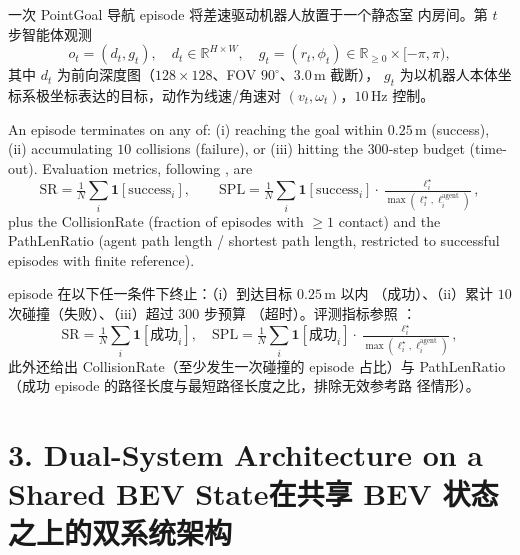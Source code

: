 \documentclass[11pt,a4paper]{article}
\providecommand{\citet}[1]{\cite{#1}}
\newcommand{\en}[1]{\par\noindent #1\par\vspace{0.15em}}
\newcommand{\zh}[1]{\par\noindent\color{zhcol}\hspace{0.5em}#1\par\color{black}\vspace{0.6em}}
\newcommand{\bisec}[2]{\section[#1]{#1\quad\normalfont\small\color{zhcol}\textsf{#2}}}
\newcommand{\R}{\mathbb{R}}
\begin{document}
\zh{\textsf{一次 PointGoal 导航 episode 将差速驱动机器人放置于一个静态室
内房间。第 $t$ 步智能体观测
\[
  o_t = (d_t, g_t),\quad
  d_t \in \R^{H\times W},\quad
  g_t = (r_t, \phi_t) \in \R_{\ge 0}\times[-\pi,\pi),
\]
其中 $d_t$ 为前向深度图（$128\times128$、FOV $90^\circ$、$3.0\,$m 截断），
$g_t$ 为以机器人本体坐标系极坐标表达的目标，动作为线速/角速对
$(v_t, \omega_t)$，$10\,$Hz 控制。}}

\en{An episode terminates on any of: (i) reaching the goal within
$0.25\,$m (success), (ii) accumulating $10$ collisions (failure), or
(iii) hitting the $300$-step budget (time-out). Evaluation metrics,
following \citet{AndersonOnEvaluation2018}, are
\[
  \mathrm{SR} = \tfrac{1}{N}\sum_{i} \mathbf{1}[\text{success}_i],
  \qquad
  \mathrm{SPL} = \tfrac{1}{N}\sum_{i} \mathbf{1}[\text{success}_i]\cdot
                 \tfrac{\ell^{\star}_i}{\max(\ell^{\star}_i,\ell^{\text{agent}}_i)},
\]
plus the CollisionRate (fraction of episodes with $\ge 1$ contact) and the
PathLenRatio (agent path length / shortest path length, restricted to
successful episodes with finite reference).}

\zh{\textsf{episode 在以下任一条件下终止：（i）到达目标 $0.25\,$m 以内
（成功）、（ii）累计 $10$ 次碰撞（失败）、（iii）超过 $300$ 步预算
（超时）。评测指标参照 \citet{AndersonOnEvaluation2018}：
\[
  \mathrm{SR} = \tfrac{1}{N}\sum_i \mathbf{1}[\text{成功}_i],\quad
  \mathrm{SPL} = \tfrac{1}{N}\sum_i \mathbf{1}[\text{成功}_i]\cdot
                 \tfrac{\ell^{\star}_i}{\max(\ell^{\star}_i,\ell^{\text{agent}}_i)},
\]
此外还给出 CollisionRate（至少发生一次碰撞的 episode 占比）与
PathLenRatio（成功 episode 的路径长度与最短路径长度之比，排除无效参考路
径情形）。}}

\bisec{3. Dual-System Architecture on a Shared BEV State}
{在共享 BEV 状态之上的双系统架构}
\end{document}
